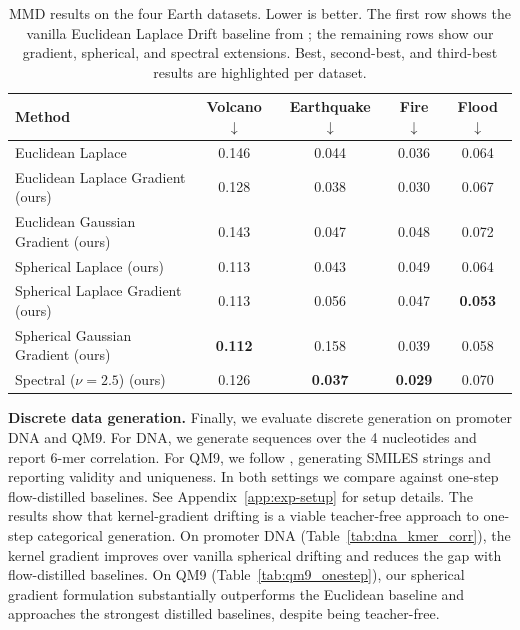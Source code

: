 \documentclass{article}
\theoremstyle{plain}
\newcommand{\best}[1]{\cellcolor{bestblue}#1}
\newcommand{\second}[1]{\cellcolor{secondblue}#1}
\newcommand{\third}[1]{\cellcolor{thirdgrayblue}#1}
\begin{document}
\begin{table}[ht!]
\centering
\setlength{\tabcolsep}{4pt}
\small
\renewcommand{\arraystretch}{1.1}
\caption{MMD results on the four Earth datasets. Lower is better. The first row shows the vanilla Euclidean Laplace Drift baseline from \cite{Deng_2026_Drift}; the remaining rows show our gradient, spherical, and spectral extensions. Best, second-best, and third-best results are highlighted per dataset.}
\begin{tabular}{lcccc}
\toprule
\textbf{Method} & \textbf{Volcano} $\downarrow$ & \textbf{Earthquake} $\downarrow$ & \textbf{Fire} $\downarrow$ & \textbf{Flood} $\downarrow$ \\
\midrule

\quad Euclidean Laplace {\tiny \cite{Deng_2026_Drift}}
& 0.146 & 0.044 & \third{0.036} & \third{0.064} \\

\midrule

\quad Euclidean Laplace Gradient (ours)
& 0.128 & \second{0.038} & \second{0.030} & 0.067 \\

\quad Euclidean Gaussian Gradient (ours)
& 0.143 & 0.047 & 0.048 & 0.072 \\

\quad Spherical Laplace (ours)
& \second{0.113} & \third{0.043} & 0.049 & \third{0.064} \\

\quad Spherical Laplace Gradient (ours)
& \second{0.113} & 0.056 & 0.047 & \best{\textbf{0.053}} \\

\quad Spherical Gaussian Gradient (ours)
& \best{\textbf{0.112}} & 0.158 & 0.039 & \second{0.058} \\

\quad Spectral ($\nu = 2.5$)  (ours)
& \third{0.126} & \best{\textbf{0.037}} & \best{\textbf{0.029}} & 0.070 \\



\bottomrule
\end{tabular}
\label{tab:earth_mmd}
\end{table}



\textbf{Discrete data generation.} Finally, we evaluate discrete generation on promoter DNA and QM9. For DNA, we generate sequences over the 4 nucleotides and report 6-mer correlation. For QM9, we follow \citet{park2026pairflow}, generating SMILES strings and reporting validity and uniqueness. In both settings we compare against one-step flow-distilled baselines. See Appendix~\ref{app:exp-setup} for setup details.
The results show that kernel-gradient drifting is a viable teacher-free approach to one-step categorical generation. On promoter DNA (Table~\ref{tab:dna_kmer_corr}), the kernel gradient improves over vanilla spherical drifting and reduces the gap with flow-distilled baselines. On QM9 (Table~\ref{tab:qm9_onestep}), our spherical gradient formulation substantially outperforms the Euclidean baseline and approaches the strongest distilled baselines, despite being teacher-free.
\end{document}
